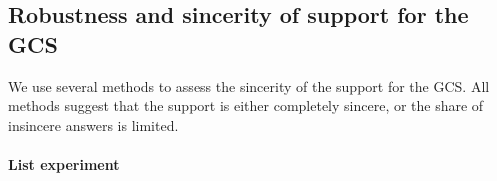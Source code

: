 


\subsection*{Robustness and sincerity of support for the GCS}\label{subsec:robustness_sincerity} %

We use several methods to assess the sincerity of the support for the GCS. %
All methods suggest that the support is either completely sincere, or the share of insincere answers is limited. %

\paragraph{List experiment}\label{subsubsec:list_exp} %

